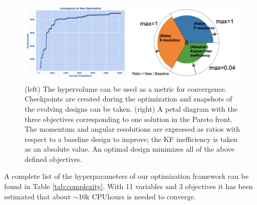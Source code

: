 \begin{figure}[!]
    \centering
    \includegraphics[scale = 0.35]{figs/convergence.png}
    \caption{(left) The hypervolume can be used as a metric for convergence. Checkpoints are created during the optimization and snapshots of the evolving designs can be taken. (right) A petal diagram with the three objectives corresponding to one solution in the Pareto front. The momentum and angular resolutions are expressed as ratios with respect to a baseline design to improve; the KF inefficiency is taken as an absolute value. An optimal design minimizes all of the above defined objectives. 
}
    \label{fig:convergence}
\end{figure}

A complete list of the hyperparameters of our optimization framework can be found in Table \ref{tab:complexity}.
With 11 variables and 3 objectives it has been estimated that about $\sim$10k CPUhours is needed to converge. 


